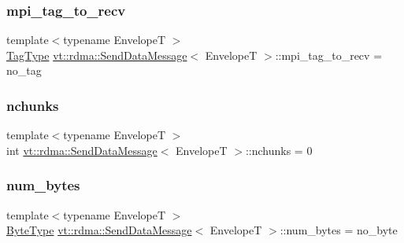 \subsubsection{\texorpdfstring{mpi\+\_\+tag\+\_\+to\+\_\+recv}{mpi\_tag\_to\_recv}}
{\footnotesize\ttfamily template$<$typename EnvelopeT $>$ \\
\hyperlink{namespacevt_a84ab281dae04a52a4b243d6bf62d0e52}{Tag\+Type} \hyperlink{structvt_1_1rdma_1_1_send_data_message}{vt\+::rdma\+::\+Send\+Data\+Message}$<$ EnvelopeT $>$\+::mpi\+\_\+tag\+\_\+to\+\_\+recv = no\+\_\+tag}

\mbox{\label{structvt_1_1rdma_1_1_send_data_message_a47083ce90f9cbdaf648ec3956e340b71}} 
\subsubsection{\texorpdfstring{nchunks}{nchunks}}
{\footnotesize\ttfamily template$<$typename EnvelopeT $>$ \\
int \hyperlink{structvt_1_1rdma_1_1_send_data_message}{vt\+::rdma\+::\+Send\+Data\+Message}$<$ EnvelopeT $>$\+::nchunks = 0}

\mbox{\label{structvt_1_1rdma_1_1_send_data_message_ab8941e418cfa243cfa88b67855d3e300}} 
\subsubsection{\texorpdfstring{num\+\_\+bytes}{num\_bytes}}
{\footnotesize\ttfamily template$<$typename EnvelopeT $>$ \\
\hyperlink{namespacevt_aab8d55968084610ce3b17057981e9300}{Byte\+Type} \hyperlink{structvt_1_1rdma_1_1_send_data_message}{vt\+::rdma\+::\+Send\+Data\+Message}$<$ EnvelopeT $>$\+::num\+\_\+bytes = no\+\_\+byte}

\mbox{\label{structvt_1_1rdma_1_1_send_data_message_a5dbd859d2b95948103b770322ee85d56}} 
